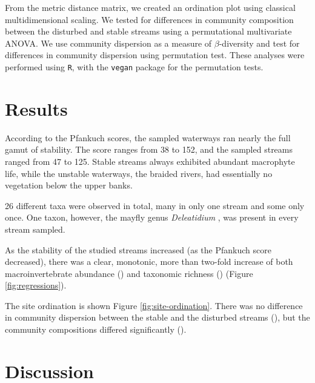 \documentclass[a4paper,10pt]{article}
\newcommand\inputresults[1]{\unskip}
\newcommand\spbinom[1]{%
	\emph{#1}%
}
\begin{document}
From the metric distance matrix, we created an ordination plot using classical multidimensional scaling.
We tested for differences in community composition between the disturbed and stable streams using a permutational multivariate ANOVA.
We use community dispersion as a measure of $\beta$-diversity \parencite{dispersion-diversity} and test for differences in community dispersion using  permutation test.
These analyses were performed using \texttt{R}, with the \texttt{vegan} package \parencite{vegan} for the permutation tests.


\section*{Results}

According to the Pfankuch scores, the sampled waterways ran nearly the full gamut of stability.
The score ranges from 38 to 152, and the sampled streams ranged from 47 to 125.
Stable streams always exhibited abundant macrophyte life, while the unstable waterways, the braided rivers, had essentially no vegetation below the upper banks.

26 different taxa were observed in total, many in only one stream and some only once.
One taxon, however, the mayfly genus \spbinom{Deleatidium}, was present in every stream sampled.


As the stability of the studied streams increased (as the Pfankuch score decreased), there was a clear, monotonic, more than two-fold increase of both macroinvertebrate abundance (\inputresults{abundance-regression}) and taxonomic richness (\inputresults{richness-regression}) (Figure \ref{fig:regressions}).

The site ordination is shown Figure \ref{fig:site-ordination}.
There was no difference in community dispersion between the stable and the disturbed streams (\inputresults{permdisp}), but the community compositions differed significantly (\inputresults{permanova}).


\section*{Discussion}
\end{document}
